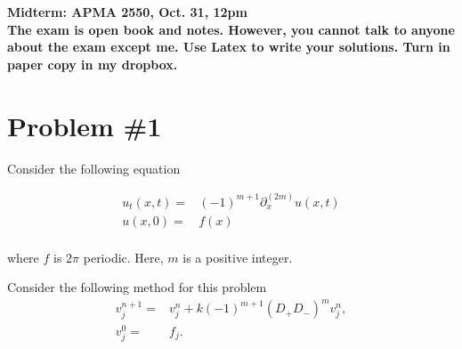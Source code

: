 \documentclass[11pt]{amsart}
\numberwithin{equation}{section}
\begin{document}
\begin{center}
    {\bf Midterm: APMA 2550, Oct. 31, 12pm \\
        The exam is open book and notes. However, you cannot talk to anyone about the exam except me. 
        Use Latex to write your solutions.  Turn in paper copy in my dropbox. 
    }
\end{center}

\section{Problem \#1}

Consider the following equation

\begin{align*}
    u_t(x,t)= & (-1)^{m+1} \partial_x^{(2 m)} u(x,t) \\
    u(x,0)=   & f(x)                                 \\
\end{align*}

where $f$ is  $2 \pi$ periodic.  Here, $m$ is  a positive integer.

Consider the following method for this problem
\begin{align*}
    v_j^{n+1} = & v_j^n + k (-1)^{m+1} (D_+ D_-)^m v_j^n, \\
    v_j^0=      & f_j.  
\end{align*}
\end{document}

